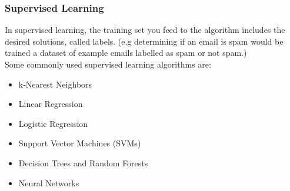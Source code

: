 \documentclass[12pt]{article}
\begin{document}
    \subsubsection{Supervised Learning}
        In supervised learning, the training set you feed to the algorithm includes the desired solutions, called labels.
        (e.g determining if an email is spam would be trained a dataset of example emails labelled as spam or not spam.) \\[0.1in] 
        Some commonly used supervised learning algorithms are:
        \begin{itemize}
            \item k-Nearest Neighbors
            \item Linear Regression
            \item Logistic Regression
            \item Support Vector Machines (SVMs)
            \item Decision Trees and Random Forests
            \item Neural Networks
        \end{itemize}
    
\end{document}
